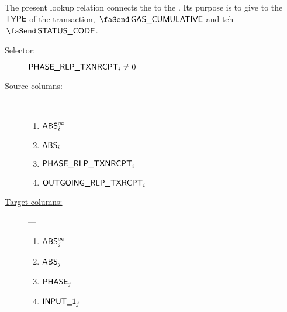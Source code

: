 The present lookup relation connects the \txnDataMod{} to the \rlpTxnRcptMod{}. Its purpose is to give to \rlpTxnRcptMod{} the $\textsf{TYPE}$ of the transaction, $\txCumulativeConsumedGas$ and teh $\txStatusCode$. 
\begin{description}
	\item[\underline{Selector:}] $\textsf{PHASE\_RLP\_TXNRCPT}_{i} \neq 0$
	\item[\underline{Source columns:}] ---
		\begin{multicols}{2}
			\begin{enumerate}
				\item $\textsf{ABS}^\infty_{i}$
				\item $\textsf{ABS}_{i}$
				\item $\textsf{PHASE\_RLP\_TXNRCPT}_{i}$
				\item $\textsf{OUTGOING\_RLP\_TXRCPT}_{i}$
			\end{enumerate}
		\end{multicols}
	\item[\underline{Target columns:}] ---
		\begin{multicols}{2}
			\begin{enumerate}
				\item $\textsf{ABS}^\infty_{j}$
				\item $\textsf{ABS}_{j}$
				\item $\textsf{PHASE}_{j}$
				\item $\textsf{INPUT\_1}_{j}$
			\end{enumerate}
		\end{multicols}
\end{description}
